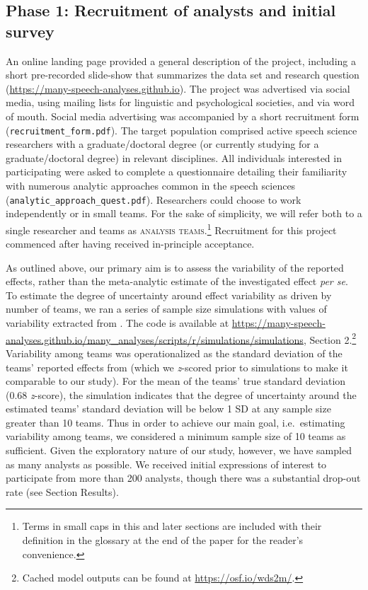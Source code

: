 \documentclass[Review,times,sageh]{sagej}
\begin{document}
\hypertarget{phase-1-recruitment-of-analysts-and-initial-survey}{%
\subsection{Phase 1: Recruitment of analysts and initial survey}\label{phase-1-recruitment-of-analysts-and-initial-survey}}

An online landing page provided a general description of the project, including a short pre-recorded slide-show that summarizes the data set and research question (\url{https://many-speech-analyses.github.io}).
The project was advertised via social media, using mailing lists for linguistic and psychological societies, and via word of mouth.
Social media advertising was accompanied by a short recruitment form (\texttt{recruitment\_form.pdf}).
The target population comprised active speech science researchers with a graduate/doctoral degree (or currently studying for a graduate/doctoral degree) in relevant disciplines.
All individuals interested in participating were asked to complete a questionnaire detailing their familiarity with numerous analytic approaches common in the speech sciences (\texttt{analytic\_approach\_quest.pdf}).
Researchers could choose to work independently or in small teams.
For the sake of simplicity, we will refer both to a single researcher and teams as \textsc{analysis teams}.\footnote{Terms in small caps in this and later sections are included with their definition in the glossary at the end of the paper for the reader's convenience.}
Recruitment for this project commenced after having received in-principle acceptance.

As outlined above, our primary aim is to assess the variability of the reported effects, rather than the meta-analytic estimate of the investigated effect \emph{per se}.
To estimate the degree of uncertainty around effect variability as driven by number of teams, we ran a series of sample size simulations with values of variability extracted from \citet{silberzahn2018many}.
The code is available at \url{https://many-speech-analyses.github.io/many_analyses/scripts/r/simulations/simulations}, Section 2.\footnote{Cached model outputs can be found at \url{https://osf.io/wds2m/}.}
Variability among teams was operationalized as the standard deviation of the teams' reported effects from \citet{silberzahn2018many} (which we \emph{z}-scored prior to simulations to make it comparable to our study).
For the mean of the teams' true standard deviation (0.68 \emph{z}-score), the simulation indicates that the degree of uncertainty around the estimated teams' standard deviation will be below 1 SD at any sample size greater than 10 teams.
Thus in order to achieve our main goal, i.e.~estimating variability among teams, we considered a minimum sample size of 10 teams as sufficient.
Given the exploratory nature of our study, however, we have sampled as many analysts as possible.
We received initial expressions of interest to participate from more than 200 analysts, though there was a substantial drop-out rate (see Section Results).
\end{document}
